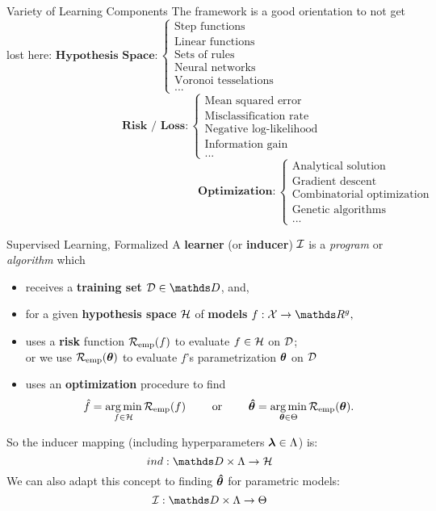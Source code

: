\documentclass[11pt,compress,t,notes=noshow, xcolor=table]{beamer}
\begin{document}
\begin{frame2}[footnotesize]{Variety of Learning Components}
The framework is a good orientation to not get lost here:
\vfill
$\textbf{Hypothesis Space}:
\begin{cases} 
\text{Step functions} \\
\text{Linear functions}\\
\text{Sets of rules}\\
\text{Neural networks}\\
\text{Voronoi tesselations}\\
\text{...}
\end{cases}$
$\phantom{Hypothesis Space RISK } \textbf{Risk / Loss}: \begin{cases}
\text{Mean squared error}\\
\text{Misclassification rate}\\
\text{Negative log-likelihood}\\
\text{Information gain}\\
\text{...}
\end{cases}$
$\phantom{hypothesis space risk RISK RISK RISK} \textbf{Optimization}: \begin{cases}
\text{Analytical solution}\\
\text{Gradient descent}\\
\text{Combinatorial optimization}\\
\text{Genetic algorithms}\\
\text{...}
\end{cases}$
\end{frame2}


\begin{frame2}{Supervised Learning, Formalized}
A \textbf{learner} (or \textbf{inducer}) $\mathcal{I}$ is a \emph{program} or \emph{algorithm} which
\begin{itemize}
  \item receives a \textbf{training set} $\D \in \allDatasets$, and,
  \item for a given \textbf{hypothesis space} $\mathcal{H}$ of \textbf{models} $f:\Xspace \rightarrow \R^g,$ 
  \item uses a \textbf{risk} function $\mathcal{R}_{\text{emp}}(f)$ to evaluate $f \in \mathcal{H}$ on $\mathcal{D}$;\\ 
  or we use $\mathcal{R}_{\text{emp}}(\bm{\theta})$ to evaluate $f$'s parametrization $\bm{\theta}$ on $\mathcal{D}$
  \item uses an \textbf{optimization} procedure to find
  $$
  \hat{f} = \mathop{\mathrm{arg\,min}}_{f \in \mathcal{H}} \mathcal{R}_{\text{emp}}(f) \qquad \text{ or } \qquad \bm{\hat\theta} = \mathop{\mathrm{arg\,min}}_{\bm{\theta} \in \Theta} \mathcal{R}_{\text{emp}}(\bm{\theta}).
  $$
\end{itemize}
So the inducer mapping (including hyperparameters $\bm{\lambda} \in \Lambda$) is:
$$
ind: \preimageInducerShort\rightarrow \Hspace
$$
We can also adapt this concept to finding $\bm{\hat\theta}$ for parametric models:
$$
\ind: \preimageInducerShort \rightarrow \Theta
$$
\end{frame2}
\end{document}
